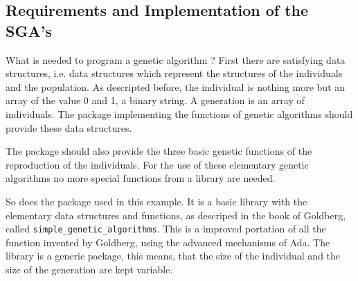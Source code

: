 \subsection{Requirements and Implementation of the SGA's}
What is needed to program a genetic algorithm ? First there are satisfying data
structures, i.e. data structures which represent the structures of the individuals
and the population. As descripted before, the individual is nothing more but
an array of the value 0 and 1, a binary string. A generation is an array of individuals.
The package implementing the functions of genetic algorithms should provide
these data structures.

The package should also provide the three basic genetic functions of the reproduction
of the individuals. For the use of these elementary genetic algorithms no more
special functions from a library are needed.

So does the package used in this example. It is a basic library with the elementary 
data structures and functions, as descriped in the book of Goldberg\cite{Gol89}, 
called {\tt simple\_genetic\_algorithms}. This is a improved portation of all
the function invented by Goldberg, using the advanced mechanisms of Ada. The 
library is a generic package, this means, that the size of the individual and 
the size of the generation are kept variable.

